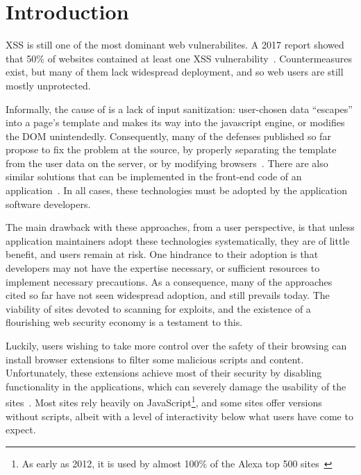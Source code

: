 \section{Introduction} \label{introduction}

\ac{XSS} is still one of the most dominant web vulnerabilites. A 2017
report showed that 50\% of websites contained at least one \ac{XSS}
vulnerability~\cite{Acunetix}. Countermeasures exist, but many of them
lack widespread deployment, and so web users are still mostly
unprotected.

Informally, the cause of \xss is a lack of input sanitization:
user-chosen data ``escapes'' into a page's template and makes its way
into the javascript engine, or modifies the DOM
unintendedly.
%
Consequently, many of the \xss defenses published so far
propose to fix the problem at the source, by properly separating the
template from the user data on the server, or by modifying
browsers~\cite{Jim:2007:DSI:1242572.1242654,Nadji:2009,Wurzinger:2009:SMX:1656360.1656379,Sundareswaran:2012:XHS:2352970.2352994}.
%
There are also similar solutions that can be implemented in the
front-end code of an application~\cite{10.1007/978-3-319-66399-9_7}.
In all cases, these technologies must be adopted by the application
software developers.

The main drawback with these approaches, from a user perspective, is
that unless application maintainers adopt these technologies
systematically, they are of little benefit, and users remain at risk.
One hindrance to their adoption is that developers may not have the
expertise necessary, or sufficient resources to implement necessary
precautions. As a consequence, many of the approaches cited so far
have not seen widespread adoption, and \xss still prevails today.
The viability of sites devoted to scanning for exploits,
and the existence of a flourishing web security economy is a testament
to this.


Luckily, users wishing to take more control over the safety of their
browsing can install browser extensions to filter some malicious
scripts and content. Unfortunately, these extensions achieve most of
their security by disabling functionality in the applications, which
can severely damage the usability of the
sites~\cite{Noscript,Snyder:2017:MWD:3133956.3133966}. Most sites rely
heavily on JavaScript\footnote{As early as 2012, it is used by almost
  100\% of the Alexa top 500
  sites~\cite{Stock:2017:WTI:3241189.3241265}}, and some sites offer
versions without scripts, albeit with a level of interactivity below
what users have come to expect.

